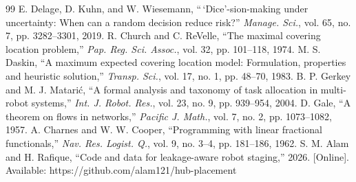 \documentclass[letterpaper,journal]{IEEEtran}
\theoremstyle{remark}
\begin{document}
\begin{thebibliography}{99}
 E. Delage, D. Kuhn, and W. Wiesemann, ``\,`Dice'-sion-making under uncertainty: When can a random decision reduce risk?'' \emph{Manage. Sci.}, vol. 65, no. 7, pp. 3282--3301, 2019.
 R. Church and C. ReVelle, ``The maximal covering location problem,'' \emph{Pap. Reg. Sci. Assoc.}, vol. 32, pp. 101--118, 1974.
 M. S. Daskin, ``A maximum expected covering location model: Formulation, properties and heuristic solution,'' \emph{Transp. Sci.}, vol. 17, no. 1, pp. 48--70, 1983.
 B. P. Gerkey and M. J. Matari\'c, ``A formal analysis and taxonomy of task allocation in multi-robot systems,'' \emph{Int. J. Robot. Res.}, vol. 23, no. 9, pp. 939--954, 2004.
 D. Gale, ``A theorem on flows in networks,'' \emph{Pacific J. Math.}, vol. 7, no. 2, pp. 1073--1082, 1957.
 A. Charnes and W. W. Cooper, ``Programming with linear fractional functionals,'' \emph{Nav. Res. Logist. Q.}, vol. 9, no. 3--4, pp. 181--186, 1962.
 S. M. Alam and H. Rafique, ``Code and data for leakage-aware robot staging,'' 2026. [Online]. Available: https://github.com/alam121/hub-placement
\end{thebibliography}
\end{document}
